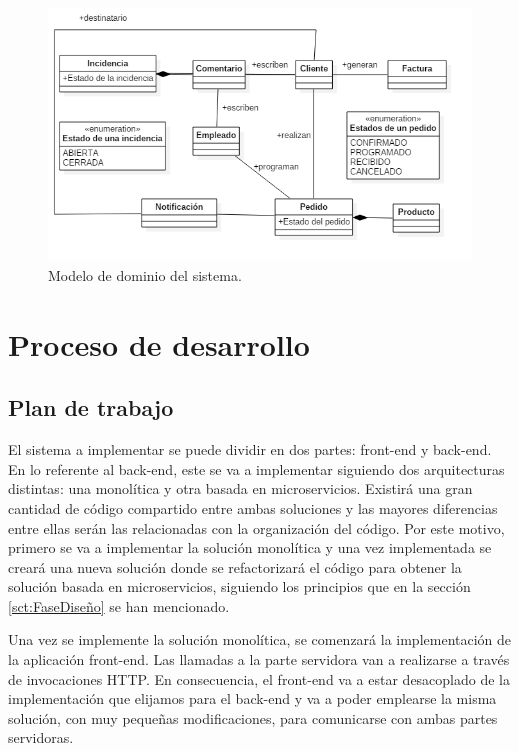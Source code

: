 \documentclass[11pt,spanish,listoffigures]{tfgetsinf}
\begin{document}
\begin{figure}[h]
\centering
\includegraphics[scale=0.6]{modelo_dominio_final}
\caption{Modelo de dominio del sistema.}
\end{figure}

%

\chapter{Proceso de desarrollo}

\section{Plan de trabajo} \label{sct:PlanTrabajo}

El sistema a implementar se puede dividir en dos partes: front-end y back-end. En lo referente al back-end, este se va a implementar siguiendo dos arquitecturas distintas: una monolítica y otra basada en microservicios. Existirá una gran cantidad de código compartido entre ambas soluciones y las mayores diferencias entre ellas serán las relacionadas con la organización del código. Por este motivo, primero se va a implementar la solución monolítica y una vez implementada se creará una nueva solución donde se refactorizará el código para obtener la solución basada en microservicios, siguiendo los principios que en la sección \ref{sct:FaseDiseño}  se han mencionado.

Una vez se implemente la solución monolítica, se comenzará la implementación de la aplicación front-end. Las llamadas a la parte servidora van a realizarse a través de invocaciones HTTP. En consecuencia, el front-end va a estar desacoplado de la implementación que elijamos para el back-end y va a poder emplearse la misma solución, con muy pequeñas modificaciones, para comunicarse con ambas partes servidoras.
\end{document}
